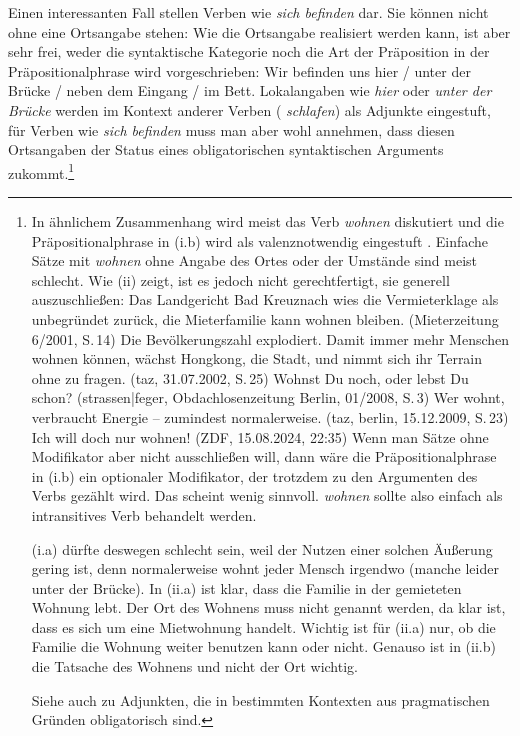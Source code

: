 \noindent
Einen interessanten Fall stellen Verben wie \emph{sich befinden} dar. Sie können
nicht ohne eine Ortsangabe stehen:
\z
Wie die Ortsangabe realisiert werden kann, ist aber sehr frei, weder die syntaktische
Kategorie noch die Art der Präposition %
in der Präpositionalphrase wird vorgeschrieben:
\ea
Wir befinden uns hier / unter der Brücke / neben dem Eingang / im Bett.
\z
Lokalangaben wie \emph{hier} oder \emph{unter der Brücke} werden im Kontext anderer Verben (\zb
\emph{schlafen}) als Adjunkte eingestuft, für Verben wie \emph{sich befinden} muss man aber wohl
annehmen, dass diesen Ortsangaben der Status eines obligatorischen syntaktischen Arguments zukommt.\footnote{
  In ähnlichem Zusammenhang wird meist das Verb \emph{wohnen} diskutiert und
  die Präpositionalphrase in (i.b) wird als valenznotwendig eingestuft 
  \parencites[Siehe z.\,B.][Kapitel~2]{Steinitz69a}[]{HS73a}[]{Bierwisch88a-u}[]{Engel94}[291]{Jacobs94a}[]{Kaufmann95a}[]{Abraham2005a}.
Einfache Sätze mit \emph{wohnen} ohne Angabe des Ortes oder der Umstände sind meist
        schlecht. 
\eal
{}
\zl
Wie (ii) zeigt, ist es jedoch nicht gerechtfertigt, sie generell auszuschließen:
        \eal
        \ex Das Landgericht Bad Kreuznach wies die Vermieterklage als unbegründet zurück,
            die Mieterfamilie kann wohnen bleiben. (Mieterzeitung 6/2001, S.\,14)
        \ex Die Bevölkerungszahl explodiert. Damit immer mehr Menschen wohnen können, wächst Hongkong, die Stadt, 
            und nimmt sich ihr Terrain ohne zu fragen.  (taz, 31.07.2002, S.\,25)
        \ex Wohnst Du noch, oder lebst Du schon? (strassen|feger, Obdachlosenzeitung Berlin, 01/2008,
        S.\,3)%
\ex Wer wohnt, verbraucht Energie -- zumindest normalerweise. (taz, berlin, 15.12.2009, S.\,23)
\ex Ich will doch nur wohnen! (ZDF, 15.08.2024, 22:35)
        \zl
Wenn man Sätze ohne Modifikator aber nicht ausschließen will, dann wäre
die Präpositionalphrase in (i.b) ein optionaler Modifikator, der trotzdem
zu den Argumenten des Verbs gezählt wird. Das scheint wenig sinnvoll. \emph{wohnen}
sollte also einfach als intransitives Verb behandelt werden.

(i.a) dürfte deswegen schlecht sein, weil der Nutzen einer solchen Äußerung gering ist,
denn normalerweise wohnt jeder Mensch irgendwo (manche leider unter der Brücke).
In (ii.a) ist klar, dass die Familie in der gemieteten Wohnung lebt. Der Ort des Wohnens muss nicht
genannt werden, da klar ist, dass es sich um eine Mietwohnung handelt. Wichtig ist für (ii.a) nur, 
ob die Familie die Wohnung weiter benutzen kann oder nicht.
Genauso ist in (ii.b) die Tatsache des Wohnens und nicht der Ort wichtig.

Siehe auch  zu Adjunkten, die in bestimmten Kontexten aus pragmatischen 
Gründen obligatorisch sind.%
}
